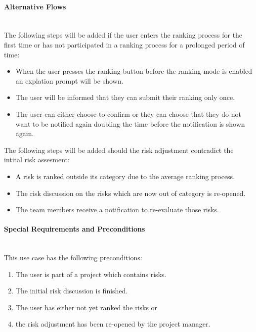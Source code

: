 \paragraph*{Alternative Flows}\mbox{}\\
The following steps will be added if the user enters the ranking process for the first time or has not participated in a ranking process for a prolonged period of time:
\begin{itemize}
	\vspace{-3mm}
	\setlength\itemsep{-1em}
	\item When the user presses the ranking button before the ranking mode is enabled an explation prompt will be shown.
	\item The user will be informed that they can submit their ranking only once.
	\item The user can either choose to confirm or they can choose that they do not want to be notified again doubling the time before the notification is shown again.
\end{itemize}

The following steps will be added should the risk adjustment contradict the intital risk assesment:
\begin{itemize}
	\vspace{-3mm}
	\setlength\itemsep{-1em}
	\item A risk is ranked outside its category due to the average ranking process.
	\item The risk discussion on the risks which are now out of category is re-opened.
	\item The team members receive a notification to re-evaluate those risks.
\end{itemize}


\paragraph*{Special Requirements and Preconditions}\mbox{}\\
This use case has the following preconditions:
\begin{enumerate}
	\vspace{-3mm}
	\setlength\itemsep{-1em}
	\item The user is part of a project which contains risks.
	\item The initial risk discussion is finished.
	\item The user has either not yet ranked the risks or 
	\item the risk adjustment has been re-opened by the project manager.
\end{enumerate}


